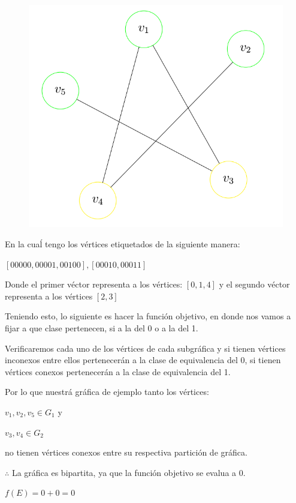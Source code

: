\documentclass{article}
\begin{document}
\begin{figure}[h]
\begin{center}
\includegraphics[scale=0.25]{./img/biPartitionGraph}
\end{center}
\end{figure}
En la cuaĺ tengo los vértices etiquetados de la siguiente manera:

$[00000,00001,00100],[00010, 00011]$

Donde el primer véctor representa a los vértices: $[0,1,4]$ y el
segundo véctor representa a los vértices $[2,3]$

Teniendo esto, lo siguiente es hacer la función objetivo, en  donde 
nos vamos a fijar a que clase pertenecen, si a la del 0 o a la del 1.

Verificaremos cada uno de los vértices de cada subgráfica y si tienen
vértices inconexos entre ellos pertenecerán a la clase de 
equivalencia del 0, si tienen vértices conexos pertenecerán a la 
clase de equivalencia del 1.

Por lo que nuestrá gráfica de ejemplo tanto los vértices:

$v_1,v_2,v_5 \in G_1$ y

$v_3,v_4 \in G_2$

no tienen vértices conexos entre su respectiva partición de gráfica.

$\therefore$ La gráfica es bipartita, ya que la función objetivo se evalua a 0.

$f(E) = 0 + 0 = 0$
\end{document}
